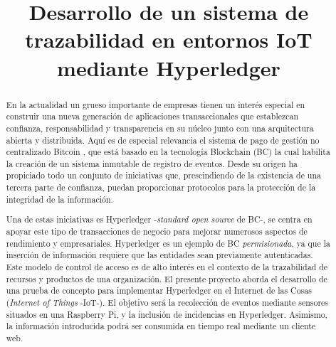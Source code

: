 \documentclass[10pt,conference,a4paper]{IEEEtran}
\begin{document}
\title{Desarrollo de un sistema de trazabilidad en entornos IoT mediante Hyperledger}

\author{
\and
{}
}

\maketitle

\begin{abstract}
    En la actualidad un grueso importante de empresas tienen un
    interés especial en construir una nueva generación de aplicaciones
    transaccionales que establezcan confianza, responsabilidad y
    transparencia en su núcleo junto con una arquitectura abierta y
    distribuida. Aquí es de especial relevancia el sistema de pago de
    gestión no centralizado Bitcoin \cite{franco:2014:UB}, que está basado
    en la tecnología Blockchain (BC) la cual habilita la creación de un
    sistema inmutable de registro de eventos. Desde su origen ha
    propiciado todo un conjunto de iniciativas que, prescindiendo de la
    existencia de una tercera parte de confianza, puedan
    proporcionar protocolos para la protección de la integridad de la
    información.

    Una de estas iniciativas es Hyperledger \cite{hyperledger:url}
    -\textit{standard open source} de BC-, se centra en apoyar
    este tipo de transacciones de negocio para mejorar numerosos
    aspectos de rendimiento y empresariales. Hyperledger es un ejemplo
    de BC \emph{permisionada}, ya que la inserción de
    información requiere que las entidades sean previamente
    autenticadas. Este modelo de control de acceso es de alto interés
    en el contexto de la trazabilidad de recursos y productos de una
    organización. El presente proyecto aborda el desarrollo de una
    prueba de concepto para implementar Hyperledger en el Internet de
    las Cosas (\emph{Internet of Things} -IoT-). El objetivo será la recolección de eventos mediante
    sensores situados en una Raspberry Pi, y la inclusión de
    incidencias en Hyperledger. Asimismo, la información introducida
    podrá ser consumida en tiempo real mediante un cliente web.
\end{abstract}
\end{document}
